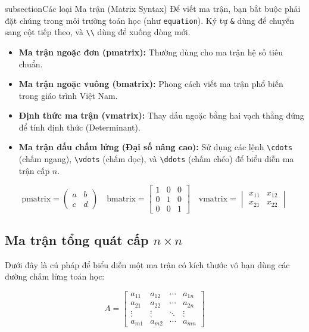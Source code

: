 \documentclass{article}
\begin{document}
subsection{Các loại Ma trận (Matrix Syntax)}
Để viết ma trận, bạn bắt buộc phải đặt chúng trong môi trường toán học (như \texttt{equation}). Ký tự \texttt{\&} dùng để chuyển sang cột tiếp theo, và \texttt{\textbackslash\textbackslash} dùng để xuống dòng mới.

\begin{itemize}
    \item \textbf{Ma trận ngoặc đơn (pmatrix):} Thường dùng cho ma trận hệ số tiêu chuẩn.
    \item \textbf{Ma trận ngoặc vuông (bmatrix):} Phong cách viết ma trận phổ biến trong giáo trình Việt Nam.
    \item \textbf{Định thức ma trận (vmatrix):} Thay dấu ngoặc bằng hai vạch thẳng đứng để tính định thức (Determinant).
    \item \textbf{Ma trận dấu chấm lửng (Đại số nâng cao):} Sử dụng các lệnh \texttt{\textbackslash cdots} (chấm ngang), \texttt{\textbackslash vdots} (chấm dọc), và \texttt{\textbackslash ddots} (chấm chéo) để biểu diễn ma trận cấp $n$.
\end{itemize}

\begin{equation}
    \text{pmatrix} = \begin{pmatrix}
        a & b \\
        c & d
    \end{pmatrix}
    \quad
    \text{bmatrix} = \begin{bmatrix}
        1 & 0 & 0 \\
        0 & 1 & 0 \\
        0 & 0 & 1
    \end{bmatrix}
    \quad
    \text{vmatrix} = \begin{vmatrix}
        x_{11} & x_{12} \\
        x_{21} & x_{22}
    \end{vmatrix}
\end{equation}

\subsection{Ma trận tổng quát cấp $n \times n$}
Dưới đây là cú pháp để biểu diễn một ma trận có kích thước vô hạn dùng các đường chấm lửng toán học:

\begin{equation}
    A = \begin{bmatrix}
        a_{11} & a_{12} & \cdots & a_{1n} \\
        a_{21} & a_{22} & \cdots & a_{2n} \\
        \vdots & \vdots & \ddots & \vdots \\
        a_{m1} & a_{m2} & \cdots & a_{mn}
    \end{bmatrix}
\end{equation}
\end{document}
